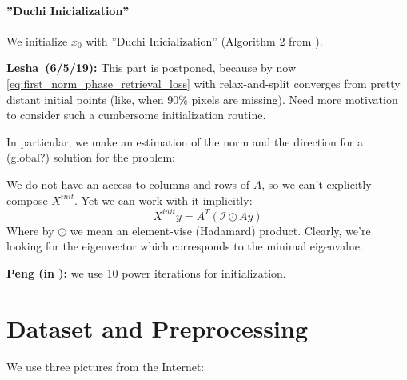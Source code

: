 \documentclass[11pt,letterpaper]{article}
\newcommand{\userId}{Lesha}
\newcommand{\Peng}[1]{\textbf{Peng (#1):}}
\newcommand{\Lesha}[1]{\textbf{\userId\ (#1):}}
\numberwithin{equation}{section} %
\numberwithin{figure}{section} %
\numberwithin{table}{section} %
\begin{document}
\paragraph{''Duchi Inicialization''} We initialize $x_0$ with ''Duchi Inicialization'' (Algorithm 2 from \cite{Duchi2017PhaseRetrival}).

\begin{tip}
    \Lesha{6/5/19} This part is postponed, because by now \ref{eq:first_norm_phase_retrieval_loss} with relax-and-split converges from pretty distant initial points (like, when 90\% pixels are missing). Need more motivation to consider such a cumbersome initialization routine.
\end{tip}
 
 In particular, we make an estimation of the norm and the direction for a (global?) solution for the problem:



We do not have an access to columns and rows of $A$, so we can't explicitly compose $X^{init}$. Yet we can work with it implicitly: 
\[
    X^{init}y = A^T(\mathcal{I}\odot Ay)
\]
Where by $\odot$ we mean an element-vise (Hadamard) product. 
Clearly, we're looking for the eigenvector which corresponds to the minimal eigenvalue.
\begin{tip}
    \Peng{in \cite{Zheng2018RelaxAndSplit}} we use 10 power iterations for initialization.
\end{tip}


\section{Dataset and Preprocessing} %
\label{sec:dataset_and_preprocessing}
We use three pictures from the Internet:
\end{document}
